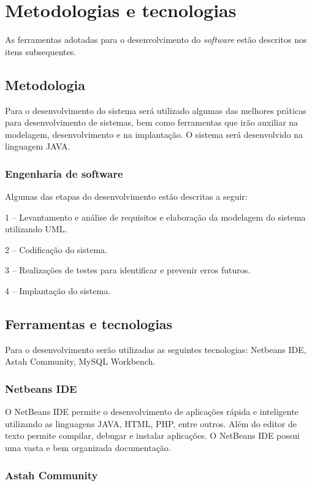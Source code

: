 \chapter{Metodologias e tecnologias}
As ferramentas adotadas para o desenvolvimento do \textit{software} estão descritos nos itens subsequentes. 

\section{Metodologia}

Para o desenvolvimento do sistema será utilizado algumas das melhores práticas para desenvolvimento de sistemas, bem como ferramentas que irão auxiliar na modelagem, desenvolvimento e na implantação. O sistema será desenvolvido na linguagem JAVA.
 \subsection{Engenharia de software}

Algumas das etapas do desenvolvimento estão descritas a seguir:

1 – Levantamento e análise de requisitos e elaboração da modelagem do sistema utilizando UML.

2 – Codificação do sistema.

3 – Realizações de testes para identificar e prevenir erros futuros.

4 – Implantação do sistema.


\section{Ferramentas e tecnologias}
Para o desenvolvimento serão utilizadas as seguintes tecnologias: Netbeans IDE, Astah Community, MySQL Workbench.




\subsection{Netbeans IDE}


O NetBeans IDE \cite{netbeans2018} permite o desenvolvimento de aplicações rápida e inteligente utilizando as linguagens JAVA, HTML, PHP, entre outros. Além do editor de texto permite compilar, debugar e instalar aplicações. O NetBeans IDE possui uma vasta e bem organizada documentação.


\subsection{Astah Community}

